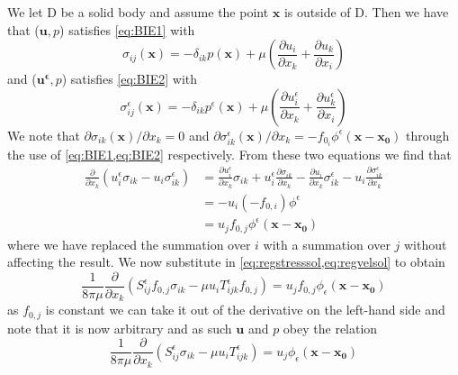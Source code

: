 We let D be a solid body and assume the point $\mathbf{x}$ is outside of D. Then we have that ($\mathbf{u},p$) satisfies \cref{eq:BIE1} with
\begin{equation*}
\sigma_{ij}(\mathbf{x}) = -\delta_{ik}p(\mathbf{x}) + \mu\left( \frac{\partial u_i}{\partial x_k} + \frac{\partial u_k}{\partial x_i} \right)
\end{equation*}
and ($\mathbf{u^\epsilon},p$) satisfies \cref{eq:BIE2} with
\begin{equation*}
\sigma^\epsilon_{ij}(\mathbf{x}) = -\delta_{ik}p^\epsilon(\mathbf{x}) + \mu\left( \frac{\partial u^\epsilon_i}{\partial x_k} + \frac{\partial u^\epsilon_k}{\partial x_i} \right)
\end{equation*}
We note that $\partial \sigma_{ik}(\mathbf{x})/ \partial x_k = 0$ and $\partial \sigma^\epsilon_{ik}(\mathbf{x})/ \partial x_k = -f_{0_i}\phi^\epsilon(\mathbf{x}-\mathbf{x_0})$ through the use of \cref{eq:BIE1,eq:BIE2} respectively. From these two equations we find that
\begin{equation*}
\begin{aligned}
  \frac{\partial}{\partial x_k}(u^\epsilon_i\sigma_{ik} - u_i\sigma^\epsilon_{ik}) &=
  \frac{\partial u^\epsilon_i}{\partial x_k} \sigma_{ik} + u^\epsilon_i\frac{\partial \sigma_{ik}}{\partial x_k} - \frac{\partial u_i}{\partial x_k} \sigma^\epsilon_{ik} - u_i\frac{\partial \sigma^\epsilon_{ik}}{\partial x_k}  \\
  & = - u_i(-f_{0,i})\phi^\epsilon  \\
  &= u_j f_{0,j}\phi^\epsilon(\mathbf{x}-\mathbf{x_0})
\end{aligned}
\end{equation*}
where we have replaced the summation over $i$ with a summation over $j$ without affecting the result.
We now substitute in \cref{eq:regstresssol,eq:regvelsol} to obtain
\begin{equation*}
  \frac{1}{8\pi\mu}\frac{\partial}{\partial x_k}(S^\epsilon_{ij}f_{0,j}\sigma_{ik} - \mu u_i T^\epsilon_{ijk}f_{0,j}) = u_j f_{0,j}\phi_\epsilon(\mathbf{x}-\mathbf{x_0})
\end{equation*}
as $f_{0,j}$ is constant we can take it out of the derivative on the left-hand side and note that it is now arbitrary and as such $\mathbf{u}$ and $p$ obey the relation
\begin{equation}
  \label{eq:reciprocalrelation}
  \frac{1}{8\pi\mu}\frac{\partial}{\partial x_k}(S^\epsilon_{ij}\sigma_{ik} - \mu u_i T^\epsilon_{ijk}) = u_j\phi_\epsilon(\mathbf{x}-\mathbf{x_0})
\end{equation}
